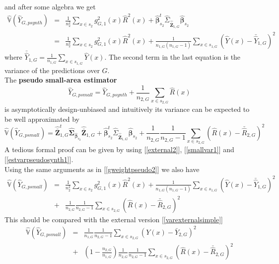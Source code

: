 \documentclass[a4paper,12pt,leqno, titlepage]{article}
\newcommand{\VAR}{\mathbb{V}}
\begin{document}
and after some algebra we get
\begin{eqnarray}\label{gweightpseudo2}
\hat{\VAR}(\hat{Y}_{G,psynth})&=&\frac{1}{n^2_2}\sum_{x\in{s_2}}g^2_{G,1}(x)\hat{R}^2(x) + \hat{\pmb{\beta}}_{s_2}^t\hat{\Sigma}_{\hat{\bar{\pmb{Z}}}_{1,G}}\hat{\pmb{\beta}}_{s_2}  \nonumber \\
&=& \frac{1}{n^2_2}\sum_{x\in{s_2}}g^2_{G,1}(x)\hat{R}^2(x)+ \frac{1}{n_{1,G}(n_{1,G}-1)}
\sum_{x\in{s_{1,G}}}(\hat{Y}(x)-\bar{\hat{Y}}_{1,G})^2
\end{eqnarray}
where $\bar{\hat{Y}}_{1,G}=\frac{1}{n_{1,G}}\sum_{x\in{s_{1,G}}}\hat{Y}(x)$. The second term in the last equation is the variance of the predictions over $G$.\\
The \textbf{pseudo small-area estimator}
\begin{equation}\label{pseudosmall}
\hat{Y}_{G,psmall}=\hat{Y}_{G,psynth}+\frac{1}{n_{2,G}}\sum_{x\in{s_{2,G}}}\hat{R}(x)
\end{equation}
is asymptotically design-unbiased and intuitively its variance can be expected to be well approximated by
\begin{equation}\label{pseudosmallvar}
\hat{\VAR}(\hat{Y}_{G,psmall})=
\hat{\bar{\pmb{Z}}}_{1,G}^t\hat{\pmb{\Sigma}}_{\hat{\pmb{\beta}}_{s_2}}\hat{\bar{\pmb{Z}}}_{1,G}
+ \hat{\pmb{\beta}}_{s_2}^t\hat{\Sigma}_{\hat{\bar{\pmb{Z}}}_{1,G}}\hat{\pmb{\beta}}_{s_2}
+\frac{1}{n_{2,G}}\frac{1}{n_{2,G}-1}\sum_{x\in{s_{2,G}}}(\hat{R}(x)-\bar{\hat{R}}_{2,G})^2
\end{equation}
A tedious formal proof can be given by using [\ref{external2}], [\ref{smallvar1}] and
[\ref{estvarpseudosynth1}].\\
Using the same arguments as in [\ref{gweightpseudo2}] we also have
\begin{eqnarray}\label{pseudosmallvar2}
\hat{\VAR}(\hat{Y}_{G,psmall})&=&\frac{1}{n^2_2}\sum_{x\in{s_2}}g^2_{G,1}(x)\hat{R}^2(x)
+ \frac{1}{n_{1,G}(n_{1,G}-1)}
\sum_{x\in{s_{1,G}}}(\hat{Y}(x)-\bar{\hat{Y}}_{1,G})^2 \nonumber \\
&+& \frac{1}{n_{2,G}}\frac{1}{n_{2,G}-1}\sum_{x\in{s_{2,G}}}(\hat{R}(x)-\bar{\hat{R}}_{2,G})^2
\end{eqnarray}
This should be compared with the external version [\ref{varexternalsimple}]
\begin{eqnarray}\label{varexternalsimpleG}
\hat{\VAR}(\hat{Y}_{G,psmall})&=&\frac{1}{n_{1,G}}\frac{1}{n_{2,G}-1}
\sum_{x\in{s_{2,G}}}(Y(x)-\bar{Y}_{2,G})^2 \nonumber \\
&+& (1-\frac{n_{2,G}}{n_{1,G}})
\frac{1}{n_{2,G}}\frac{1}{n_{2,G}-1}\sum_{x\in{s_{2,G}}}(\hat{R}(x)-\bar{\hat{R}}_{2,G})^2
\end{eqnarray}
\end{document}
